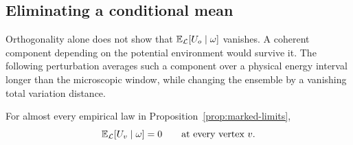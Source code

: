 \subsection{Eliminating a conditional mean}

Orthogonality alone does not show that
\(\mathbb E_{\mathcal L}[U_o\mid\omega]\) vanishes.  A coherent component
depending on the potential environment would survive it.  The
following perturbation averages such a component over a physical
energy interval longer than the microscopic window, while changing
the ensemble by a vanishing total variation distance.

\begin{lemma}\label{lem:conditional-mean}
For almost every empirical law in Proposition~\ref{prop:marked-limits},
\begin{equation}\label{eq:conditional-zero-mean}
 \mathbb E_{\mathcal L}[U_v\mid\omega]=0
 \qquad\text{at every vertex }v.
\end{equation}
\end{lemma}

